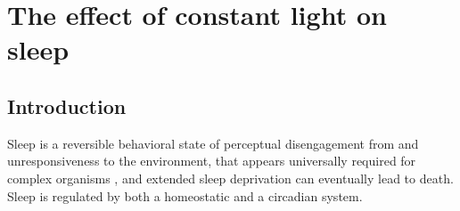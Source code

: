 
\chapter{\label{ch:3-lleeg}The effect of constant light on sleep}
\minitoc
\minilof
\newpage

\section{Introduction}

%

Sleep is a reversible behavioral state of perceptual disengagement from and
unresponsiveness to the environment, 
that appears universally required for complex organisms
\cite{meir_h._kryger_principles_2017, cirelli_is_2008}, and extended 
sleep deprivation can eventually lead to death\cite{everson_functional_1995}.
Sleep is regulated by both a homeostatic and a circadian 
system\cite{borbely_two-process_2016}.

